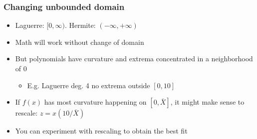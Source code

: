 \documentclass[bigger]{beamer}
\begin{document}
\begin{frame}%

\frametitle{Changing unbounded domain}

\begin{itemize}
\item Laguerre: $[0,\infty )$. Hermite: $\left( -\infty ,+\infty \right) $

\item Math will work without change of domain

\item But polynomials have curvature and extrema \newline
concentrated in a neighborhood of $0$

\begin{itemize}
\item E.g. Laguerre deg. 4 no extrema outside $\left[ 0,10\right] $
\end{itemize}

\item If $f\left( x\right) $ has most curvature happening on $\left[ 0,\bar{X%
}\right] $,\newline
it might make sense to rescale: $z=x\left( 10/\bar{X}\right) $

\item You can experiment with rescaling to obtain the best fit
\end{itemize}


\end{frame}
\end{document}
